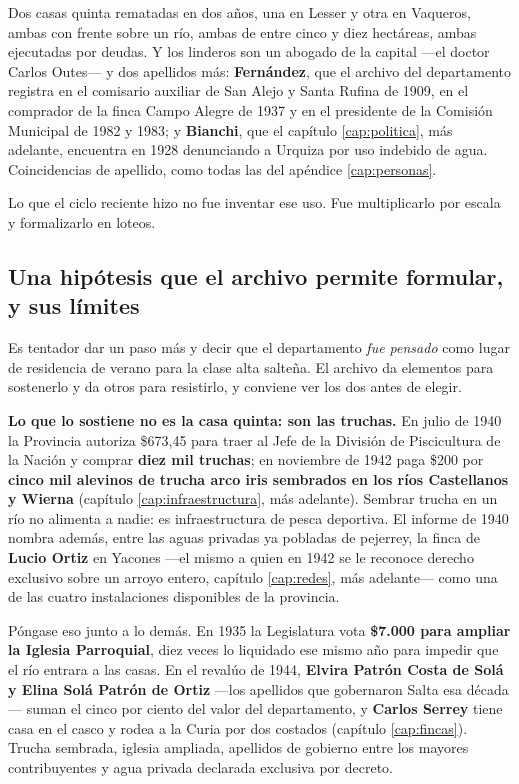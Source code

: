 Dos casas quinta rematadas en dos años, una en Lesser y otra en Vaqueros, ambas con frente
sobre un río, ambas de entre cinco y diez hectáreas, ambas ejecutadas por deudas. Y los
linderos son un abogado de la capital ---el doctor Carlos Outes--- y dos apellidos más:
\textbf{Fernández}, que el archivo del departamento registra en el comisario auxiliar de San
Alejo y Santa Rufina de 1909, en el comprador de la finca Campo Alegre de 1937 y en el
presidente de la Comisión Municipal de 1982 y 1983; y \textbf{Bianchi}, que el capítulo
\ref{cap:politica}, más adelante, encuentra en 1928 denunciando a Urquiza por uso indebido de agua.
Coincidencias de apellido, como todas las del apéndice \ref{cap:personas}.

Lo que el ciclo reciente hizo no fue inventar ese uso. Fue multiplicarlo por escala y
formalizarlo en loteos.

\subsection*{Una hipótesis que el archivo permite formular, y sus límites}

Es tentador dar un paso más y decir que el departamento \textit{fue pensado} como lugar de
residencia de verano para la clase alta salteña. El archivo da elementos para sostenerlo y da
otros para resistirlo, y conviene ver los dos antes de elegir.

\textbf{Lo que lo sostiene no es la casa quinta: son las truchas.} En julio de 1940 la
Provincia autoriza \$673,45 para traer al Jefe de la División de Piscicultura de la Nación y
comprar \textbf{diez mil truchas}; en noviembre de 1942 paga \$200 por \textbf{cinco mil
alevinos de trucha arco iris sembrados en los ríos Castellanos y Wierna} (capítulo
\ref{cap:infraestructura}, más adelante). Sembrar trucha en un río no alimenta a nadie: es infraestructura
de pesca deportiva. El informe de 1940 nombra además, entre las aguas privadas ya pobladas de
pejerrey, la finca de \textbf{Lucio Ortiz} en Yacones ---el mismo a quien en 1942 se le
reconoce derecho exclusivo sobre un arroyo entero, capítulo \ref{cap:redes}, más adelante--- como una de las
cuatro instalaciones disponibles de la provincia.

Póngase eso junto a lo demás. En 1935 la Legislatura vota \textbf{\$7.000 para ampliar la
Iglesia Parroquial}, diez veces lo liquidado ese mismo año para impedir que el río entrara a
las casas. En el revalúo de 1944, \textbf{Elvira Patrón Costa de Solá y Elina Solá Patrón de
Ortiz} ---los apellidos que gobernaron Salta esa década--- suman el cinco por ciento del
valor del departamento, y \textbf{Carlos Serrey} tiene casa en el casco y
rodea a la Curia por dos costados (capítulo \ref{cap:fincas}). Trucha sembrada, iglesia
ampliada, apellidos de gobierno entre los mayores contribuyentes y agua privada declarada
exclusiva por decreto.

